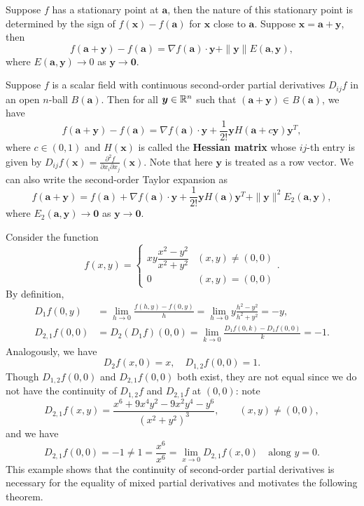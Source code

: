     \begin{remarkenv}
        Suppose $f$ has a stationary point at $\bm a$, then the nature of this stationary point is determined by the sign of $f(\bm x) - f(\bm a)$ for $\bm x$ close to $\bm a$. Suppose $\bm x = \bm a + \bm y$, then
        $$ f(\bm a + \bm y) - f(\bm a) = \nabla f(\bm a) \cdot \bm y + \| \bm y\| E(\bm a, \bm y),$$
        where $E(\bm a, \bm y) \to 0$ as $\bm y \to \bm 0$.
    \end{remarkenv}
    \begin{theoremenv}
        Suppose $f$ is a scalar field with continuous second-order partial derivatives $D_{ij} f$ in an open $n$-ball $B(\bm a)$. Then for all $\bm y \in \mathbb{R}^n$ such that $(\bm a + \bm y) \in B(\bm a)$, we have
        $$ 
        f(\bm a + \bm y) - f(\bm a ) = \nabla f(\bm a) \cdot \bm y + \frac{1}{2!} \bm y H(\bm a + c \bm y) \bm y^T,
        $$
        where $c\in (0,1)$ and $H(\bm x)$ is called the \textbf{Hessian matrix} whose $ij$-th entry is given by $D_{ij} f(\bm x) = \displaystyle \frac{\partial^2 f}{\partial x_i \partial x_j}(\bm x)$. Note that here $\bm y$ is treated as a row vector. We can also write the second-order Taylor expansion as
        $$
        f(\bm a + \bm y) = f(\bm a) + \nabla f(\bm a) \cdot \bm y + \frac{1}{2!} \bm y H(\bm a) \bm y^T + \| \bm y \|^2 E_2(\bm a, \bm y),
        $$
        where $E_2(\bm a, \bm y) \to \bm 0$ as $\bm y \to \bm 0$.
    \end{theoremenv}
    \begin{exampleenv}
        Consider the function
        $$
        f(x,y) = \begin{cases}
            xy\dfrac{x^2-y^2}{x^2+y^2} & (x,y) \ne (0,0) \\[6pt]
            0 & (x,y) = (0,0)
        \end{cases}.
        $$
        By definition,
        $$ \begin{aligned}
            D_1 f(0,y) &= \lim_{h\to 0} \frac{f(h,y) - f(0,y)}{h} = \lim_{h\to 0} y \frac{h^2 - y^2}{h^2 + y^2} = -y, \\ D_{2,1}f(0,0) &= D_2(D_1f)(0,0) = \lim_{k \to 0} \frac{D_1 f(0,k) - D_1 f(0,0)}{k} = -1.
        \end{aligned}$$
        Analogously, we have
        $$
        D_2 f(x,0) = x, \quad D_{1,2} f(0,0) = 1.
        $$
        Though $D_{1,2} f(0,0)$ and $D_{2,1} f(0,0)$ both exist, they are not equal since we do not have the continuity of $D_{1,2} f$ and $D_{2,1} f$ at $(0,0)$: note
        $$
        D_{2,1}f(x,y)
        =
        \frac{x^6+9x^4y^2-9x^2y^4-y^6}{(x^2+y^2)^3},
        \qquad (x,y)\neq(0,0),
        $$
        and we have
        $$ D_{2,1}f(0,0)=-1 \ne 1 =\frac{x^6}{x^6} =\lim_{x \to 0} D_{2,1}f(x,0)\quad \text{along } y=0. $$
        This example shows that the continuity of second-order partial derivatives is necessary for the equality of mixed partial derivatives and motivates the following theorem.
    \end{exampleenv}
